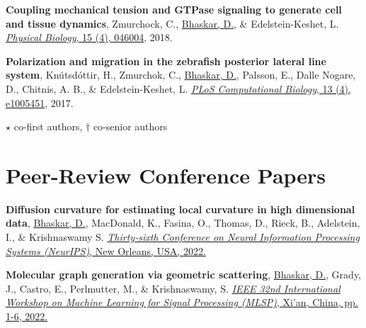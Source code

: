 \documentclass[margin,line]{res}
\begin{document}
\begin{resume}
{\begin{etaremune}[start=7]
\vspace*{.1cm}
\item{\bf Coupling mechanical tension and GTPase signaling to generate cell and tissue dynamics}, 
Zmurchock, C., \underline{Bhaskar, D.}, \& Edelstein-Keshet, L. 
\href{https://iopscience.iop.org/article/10.1088/1478-3975/aab1c0/meta}{\textit{Physical Biology}, 15 (4), 046004}, 2018.
\vspace*{.1cm}
\item{\bf Polarization and migration in the zebrafish posterior lateral line system}, 
Kn\'{u}tsd\'{o}ttir, H., Zmurchok, C., \underline{Bhaskar, D.}, Palsson, E., Dalle Nogare, D., Chitnis, A. B., \& Edelstein-Keshet, L. 
\href{https://journals.plos.org/ploscompbiol/article?id=10.1371/journal.pcbi.1005451&rev=2}{\textit{PLoS Computational Biology}, 13 (4), e1005451}, 2017.
\item[] $\star$ co-first authors, $\dagger$ co-senior authors
\end{etaremune}
}

\vspace*{.15cm}

\section{\sc Peer-Review Conference Papers}
{
\renewcommand\leftmargini{0em}
\renewcommand{\labelenumi}{C\theenumi}
\begin{etaremune}[start=2]
\item{\bf Diffusion curvature for estimating local curvature in high dimensional data},
\underline{Bhaskar, D.}, MacDonald, K., Fasina, O., Thomas, D., Rieck, B., Adelstein, I., \& Krishnaswamy S.
\href{https://arxiv.org/abs/2206.03977}{\textit{Thirty-sixth Conference on Neural Information Processing Systems (NeurIPS)}, New Orleans, USA, 2022.}
\item{\bf Molecular graph generation via geometric scattering},
\underline{Bhaskar, D.}, Grady, J., Castro, E., Perlmutter, M., \& Krishnaswamy, S.
\href{https://doi.org/10.1109/MLSP55214.2022.9943379}{\textit{IEEE 32nd International Workshop on Machine Learning for Signal Processing (MLSP)}, Xi'an, China, pp. 1-6, 2022.}
\end{etaremune}
}

\vspace*{.15cm}


\end{resume}
\end{document}
